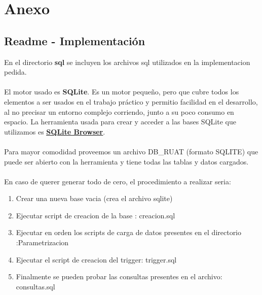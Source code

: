 \section{Anexo}
\subsection{Readme - Implementación}
En el directorio \textbf{sql} se incluyen los archivos sql utilizados en la implementacion pedida.\\
\\
\indent El motor usado es \textbf{SQLite}. Es un motor pequeño, pero que cubre todos los elementos a ser usados en el trabajo práctico y permitio facilidad en el desarrollo, al no precisar un entorno complejo corriendo, junto a su poco consumo en espacio. La herramienta usada para crear y acceder a las bases SQLite que utilizamos es \href{http://sqlitebrowser.org/}{\underline{\textbf{SQLite Browser}}}.\\
\\
\indent Para mayor comodidad proveemos un archivo DB\_RUAT (formato SQLITE) que puede ser abierto con la herramienta y tiene todas las tablas y datos cargados.\\
\\
\indent En caso de querer generar todo de cero, el procedimiento a realizar seria:
\begin{enumerate}
	\item Crear una nueva base vacia (crea el archivo sqlite)
	\item Ejecutar script de creacion de la base : creacion.sql
	\item Ejecutar en orden los scripts de carga de datos presentes en el directorio :Parametrizacion
	\item Ejecutar el script de creacion del trigger: trigger.sql
	\item Finalmente se pueden probar las consultas presentes en el archivo: consultas.sql
\end{enumerate}
\indent {}